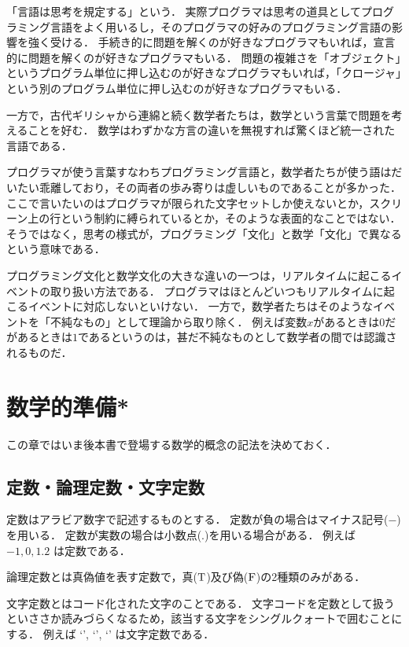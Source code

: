 \documentclass[twocolumn]{jsbook}
\begin{document}
「言語は思考を規定する」という．
実際プログラマは思考の道具としてプログラミング言語をよく用いるし，そのプログラマの好みのプログラミング言語の影響を強く受ける．
手続き的に問題を解くのが好きなプログラマもいれば，宣言的に問題を解くのが好きなプログラマもいる．
問題の複雑さを「オブジェクト」というプログラム単位に押し込むのが好きなプログラマもいれば，「クロージャ」という別のプログラム単位に押し込むのが好きなプログラマもいる．

一方で，古代ギリシャから連綿と続く数学者たちは，数学という言葉で問題を考えることを好む．
数学はわずかな方言の違いを無視すれば驚くほど統一された言語である．

プログラマが使う言葉すなわちプログラミング言語と，数学者たちが使う語はだいたい乖離しており，その両者の歩み寄りは虚しいものであることが多かった．
ここで言いたいのはプログラマが限られた文字セットしか使えないとか，スクリーン上の行という制約に縛られているとか，そのような表面的なことではない．
そうではなく，思考の様式が，プログラミング「文化」と数学「文化」で異なるという意味である．

プログラミング文化と数学文化の大きな違いの一つは，リアルタイムに起こるイベントの取り扱い方法である．
プログラマはほとんどいつもリアルタイムに起こるイベントに対応しないといけない．
一方で，数学者たちはそのようなイベントを「不純なもの」として理論から取り除く．
例えば変数$x$があるときは$0$だがあるときは$1$であるというのは，甚だ不純なものとして数学者の間では認識されるものだ．

\chapter{数学的準備*}

この章ではいま後本書で登場する数学的概念の記法を決めておく．

\section{定数・論理定数・文字定数}

定数はアラビア数字で記述するものとする．
定数が負の場合はマイナス記号($-$)を用いる．
定数が実数の場合は小数点($.$)を用いる場合がある．
例えば $-1, 0, 1.2$ は定数である．

論理定数とは真偽値を表す定数で，真($\text{T}$)及び偽($\text{F}$)の2種類のみがある．

文字定数とはコード化された文字のことである．
文字コードを定数として扱うといささか読みづらくなるため，該当する文字をシングルクォートで囲むことにする．
例えば `', `', `' は文字定数である．
\end{document}
